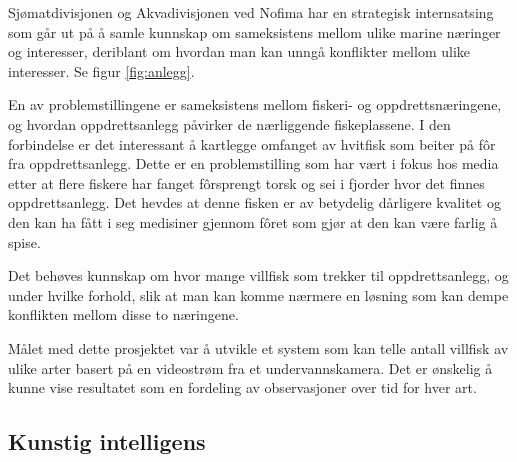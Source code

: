 Sjømatdivisjonen og Akvadivisjonen ved Nofima har en strategisk internsatsing som går ut på å samle kunnskap om sameksistens mellom ulike marine næringer og interesser, deriblant om hvordan man kan unngå konflikter mellom ulike interesser. Se figur \ref{fig:anlegg}. \cite{Robertsen 2020}

En av problemstillingene er sameksistens mellom fiskeri- og oppdrettsnæringene, og hvordan oppdrettsanlegg påvirker de nærliggende fiskeplassene. I den forbindelse er det interessant å kartlegge omfanget av hvitfisk som beiter på fôr fra oppdrettsanlegg. Dette er en problemstilling som har vært i fokus hos media etter at flere fiskere har fanget fôrsprengt torsk og sei i fjorder hvor det finnes oppdrettsanlegg. Det hevdes at denne fisken er av betydelig dårligere kvalitet og den kan ha fått i seg medisiner gjennom fôret som gjør at den kan være farlig å spise. \cite{Olsen 2019}

Det behøves kunnskap om hvor mange villfisk som trekker til oppdrettsanlegg, og under hvilke forhold, slik at man kan komme nærmere en løsning som kan dempe konflikten mellom disse to næringene. 

Målet med dette prosjektet var å utvikle et system som kan telle antall villfisk av ulike arter basert på en videostrøm fra et undervannskamera. Det er ønskelig å kunne vise resultatet som en fordeling av observasjoner over tid for hver art. 

\subsection{Kunstig intelligens}

